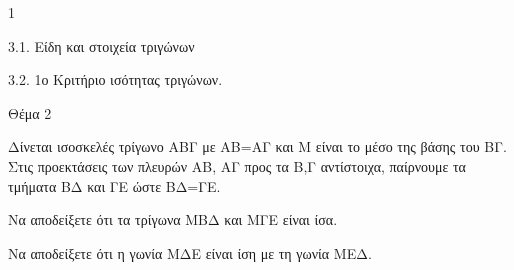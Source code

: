 \begin{ylh}{1}
    \item 3.1. Είδη και στοιχεία τριγώνων
    \item 3.2. 1ο Κριτήριο ισότητας τριγώνων.
\end{ylh}

Θέμα 2

Δίνεται ισοσκελές τρίγωνο ΑΒΓ με ΑΒ=ΑΓ και Μ είναι το μέσο της βάσης του ΒΓ. Στις προεκτάσεις των πλευρών ΑΒ, ΑΓ προς τα Β,Γ αντίστοιχα, παίρνουμε τα τμήματα ΒΔ και ΓΕ ώστε ΒΔ=ΓΕ.

\begin{alist}
\item Να αποδείξετε ότι τα τρίγωνα ΜΒΔ και ΜΓΕ είναι ίσα. 

\item Να αποδείξετε ότι η γωνία ΜΔΕ είναι ίση με τη γωνία ΜΕΔ. 
\end{alist}
